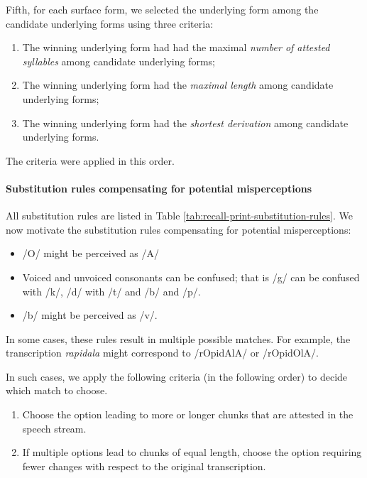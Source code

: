 \documentclass[]{article}
\providecommand{\tightlist}{%
  \setlength{\itemsep}{0pt}\setlength{\parskip}{0pt}}
\let\oldparagraph\paragraph
\renewcommand{\paragraph}[1]{\oldparagraph{#1}\mbox{}}
\begin{document}
Fifth, for each surface form, we selected the underlying form among the candidate underlying forms using three criteria:

\begin{enumerate}
\def\labelenumi{\arabic{enumi}.}
\tightlist
\item
The winning underlying form had had the maximal \emph{number of attested syllables} among candidate underlying forms;
\item
The winning underlying form had the \emph{maximal length} among candidate underlying forms;
\item
The winning underlying form had the \emph{shortest derivation} among candidate underlying forms.
\end{enumerate}

The criteria were applied in this order.

\paragraph{Substitution rules compensating for potential misperceptions}\label{substitution-rules-compensating-for-potential-misperceptions}

All substitution rules are listed in Table \ref{tab:recall-print-substitution-rules}. We now motivate the substitution rules compensating for potential misperceptions:

\begin{itemize}
\tightlist
\item
  /O/ might be perceived as /A/
\item
Voiced and unvoiced consonants can be confused; that is /g/ can be confused with /k/, /d/ with /t/ and /b/ and /p/.
\item
  /b/ might be perceived as /v/.
\end{itemize}

In some cases, these rules result in multiple possible matches. For example, the transcription \emph{rapidala} might correspond to /rOpidAlA/ or /rOpidOlA/.

In such cases, we apply the following criteria (in the following order) to decide which match to choose.

\begin{enumerate}
\def\labelenumi{\arabic{enumi}.}
\tightlist
\item
Choose the option leading to more or longer chunks that are attested in the speech stream.
\item
If multiple options lead to chunks of equal length, choose the option requiring fewer changes with respect to the original transcription.
\end{enumerate}
\end{document}
